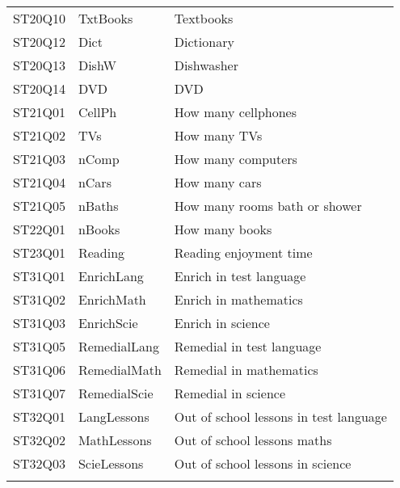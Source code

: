 \documentclass[letterpaper,11pt]{article}
\begin{document}
\begin{longtable}{lll}
  ST20Q10 & TxtBooks & Textbooks \\ 
  ST20Q12 & Dict & Dictionary \\ 
  ST20Q13 & DishW & Dishwasher \\ 
  ST20Q14 & DVD & DVD \\ 
  ST21Q01 & CellPh & How many cellphones \\ 
  ST21Q02 & TVs & How many TVs \\ 
  ST21Q03 & nComp & How many computers \\ 
  ST21Q04 & nCars & How many cars \\ 
  ST21Q05 & nBaths & How many rooms bath or shower \\ 
  ST22Q01 & nBooks & How many books \\ 
  ST23Q01 & Reading & Reading enjoyment time \\ 
  ST31Q01 & EnrichLang & Enrich in test language \\ 
  ST31Q02 & EnrichMath & Enrich in mathematics \\ 
  ST31Q03 & EnrichScie & Enrich in science \\ 
  ST31Q05 & RemedialLang & Remedial in test language \\ 
  ST31Q06 & RemedialMath & Remedial in mathematics \\ 
  ST31Q07 & RemedialScie & Remedial in science \\ 
  ST32Q01 & LangLessons & Out of school lessons in test language \\ 
  ST32Q02 & MathLessons & Out of school lessons maths \\ 
  ST32Q03 & ScieLessons & Out of school lessons in science \\ 
   \hline
\hline
\label{covariates}
\end{longtable}
\end{document}
